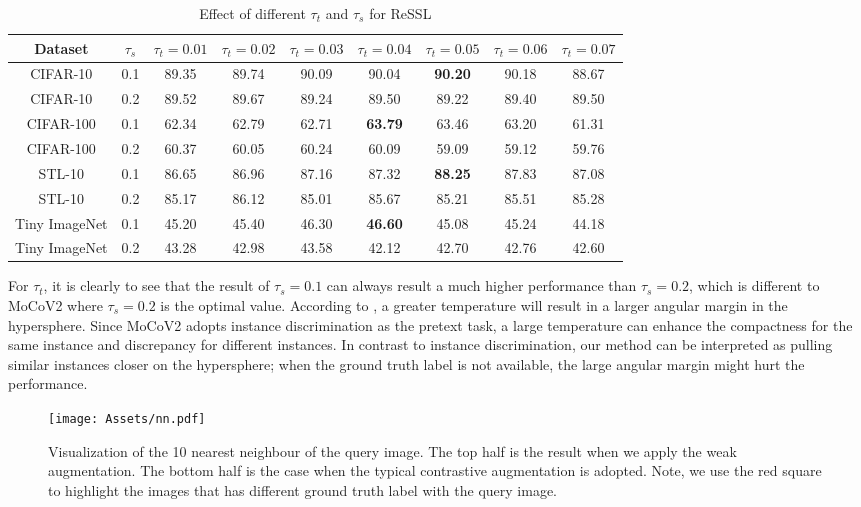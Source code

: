 \documentclass{article}
\newcommand{\<}{\left\langle}
\renewcommand{\>}{\right\rangle}
\begin{document}
\renewcommand\arraystretch{1.15}
\begin{table}[h]
 \centering
 \setlength\tabcolsep{5pt}
 \small
 \caption{Effect of different $\tau_t$ and $\tau_s$ for ReSSL}
 \vspace{-5pt}
 \label{table:ablation_t}
\begin{tabular}{c c c c c c c c c } 
\toprule 
Dataset        & $\tau_s$ & $\tau_t = 0.01$ & $\tau_t = 0.02$ & $\tau_t = 0.03$ & $\tau_t = 0.04$ & $\tau_t = 0.05$ & $\tau_t = 0.06$ & $\tau_t = 0.07$ \\ \hline
CIFAR-10       & 0.1 & 89.35  & 89.74 & 90.09 & 90.04 & \textbf{90.20} & 90.18 & 88.67 \\
CIFAR-10       & 0.2 & 89.52  & 89.67 & 89.24 & 89.50 & 89.22 & 89.40 & 89.50 \\ \hline
CIFAR-100      & 0.1 & 62.34  & 62.79 & 62.71 & \textbf{63.79} & 63.46 & 63.20 & 61.31 \\
CIFAR-100      & 0.2 & 60.37  & 60.05 & 60.24 & 60.09 & 59.09 & 59.12 & 59.76 \\ \hline
STL-10         & 0.1 & 86.65  & 86.96 & 87.16 & 87.32 & \textbf{88.25} & 87.83 & 87.08 \\
STL-10         & 0.2 & 85.17  & 86.12 & 85.01 & 85.67 & 85.21 & 85.51 & 85.28 \\ \hline
Tiny ImageNet  & 0.1 & 45.20  & 45.40 & 46.30 & \textbf{46.60} & 45.08 & 45.24 & 44.18 \\
Tiny ImageNet  & 0.2 & 43.28  & 42.98 & 43.58 & 42.12 & 42.70 & 42.76 & 42.60 \\
\toprule 
\end{tabular}
\end{table}
For $\tau_t$, it is clearly to see that the result of $\tau_s = 0.1$ can always result a much higher performance than $\tau_s = 0.2$, which is different to MoCoV2 where $\tau_s = 0.2$ is the optimal value. According to \cite{NormFace, CosFace, ArcFace}, a greater temperature will result in a larger angular margin in the hypersphere. Since MoCoV2 adopts instance discrimination as the pretext task, a large temperature can enhance the compactness for the same instance and discrepancy for different instances. In contrast to instance discrimination, our method can be interpreted as pulling similar instances closer on the hypersphere; when the ground truth label is not available, the large angular margin might hurt the performance.


\begin{figure}
    \centering
    \texttt{[image: Assets/nn.pdf]}
    \vspace{-10pt}
    \caption{Visualization of the 10 nearest neighbour of the query image. The top half is the result when we apply the weak augmentation. The bottom half is the case when the typical contrastive augmentation is adopted. Note, we use the red square to highlight the images that has different ground truth label with the query image.}
    \label{fig:nn}
    \vspace{-12pt}
\end{figure}
\end{document}
